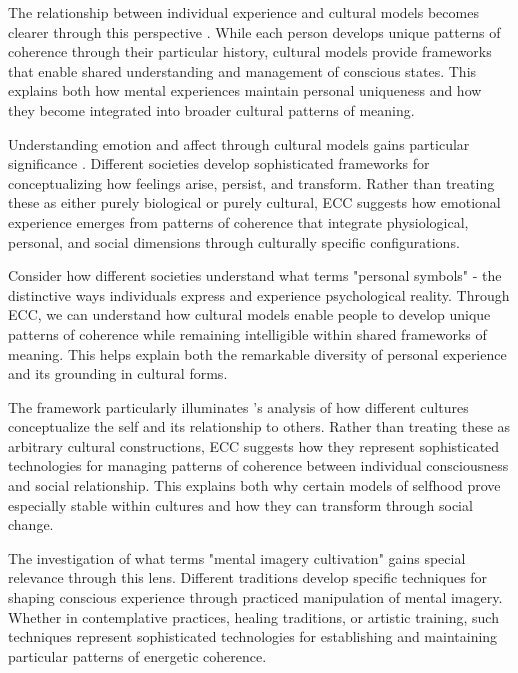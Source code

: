 The relationship between individual experience and cultural models becomes clearer through this perspective \cite{white1994ethnopsychology}. While each person develops unique patterns of coherence through their particular history, cultural models provide frameworks that enable shared understanding and management of conscious states. This explains both how mental experiences maintain personal uniqueness and how they become integrated into broader cultural patterns of meaning.

Understanding emotion and affect through cultural models gains particular significance \cite{wikan1990managing}. Different societies develop sophisticated frameworks for conceptualizing how feelings arise, persist, and transform. Rather than treating these as either purely biological or purely cultural, ECC suggests how emotional experience emerges from patterns of coherence that integrate physiological, personal, and social dimensions through culturally specific configurations.

Consider how different societies understand what \cite{obeyesekere1981medusa} terms "personal symbols" - the distinctive ways individuals express and experience psychological reality. Through ECC, we can understand how cultural models enable people to develop unique patterns of coherence while remaining intelligible within shared frameworks of meaning. This helps explain both the remarkable diversity of personal experience and its grounding in cultural forms.

The framework particularly illuminates \cite{myers1986pintupi}'s analysis of how different cultures conceptualize the self and its relationship to others. Rather than treating these as arbitrary cultural constructions, ECC suggests how they represent sophisticated technologies for managing patterns of coherence between individual consciousness and social relationship. This explains both why certain models of selfhood prove especially stable within cultures and how they can transform through social change.

The investigation of what \cite{noll1985mental} terms "mental imagery cultivation" gains special relevance through this lens. Different traditions develop specific techniques for shaping conscious experience through practiced manipulation of mental imagery. Whether in contemplative practices, healing traditions, or artistic training, such techniques represent sophisticated technologies for establishing and maintaining particular patterns of energetic coherence.

